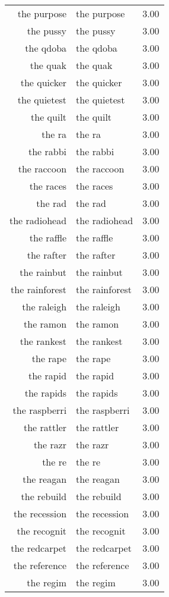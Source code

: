 \begin{table}[ht]
\begin{tabular}{rlr}
  the purpose & the purpose & 3.00 \\ 
  the pussy & the pussy & 3.00 \\ 
  the qdoba & the qdoba & 3.00 \\ 
  the quak & the quak & 3.00 \\ 
  the quicker & the quicker & 3.00 \\ 
  the quietest & the quietest & 3.00 \\ 
  the quilt & the quilt & 3.00 \\ 
  the ra & the ra & 3.00 \\ 
  the rabbi & the rabbi & 3.00 \\ 
  the raccoon & the raccoon & 3.00 \\ 
  the races & the races & 3.00 \\ 
  the rad & the rad & 3.00 \\ 
  the radiohead & the radiohead & 3.00 \\ 
  the raffle & the raffle & 3.00 \\ 
  the rafter & the rafter & 3.00 \\ 
  the rainbut & the rainbut & 3.00 \\ 
  the rainforest & the rainforest & 3.00 \\ 
  the raleigh & the raleigh & 3.00 \\ 
  the ramon & the ramon & 3.00 \\ 
  the rankest & the rankest & 3.00 \\ 
  the rape & the rape & 3.00 \\ 
  the rapid & the rapid & 3.00 \\ 
  the rapids & the rapids & 3.00 \\ 
  the raspberri & the raspberri & 3.00 \\ 
  the rattler & the rattler & 3.00 \\ 
  the razr & the razr & 3.00 \\ 
  the re & the re & 3.00 \\ 
  the reagan & the reagan & 3.00 \\ 
  the rebuild & the rebuild & 3.00 \\ 
  the recession & the recession & 3.00 \\ 
  the recognit & the recognit & 3.00 \\ 
  the redcarpet & the redcarpet & 3.00 \\ 
  the reference & the reference & 3.00 \\ 
  the regim & the regim & 3.00 \\ 

\end{tabular}
\end{table}
